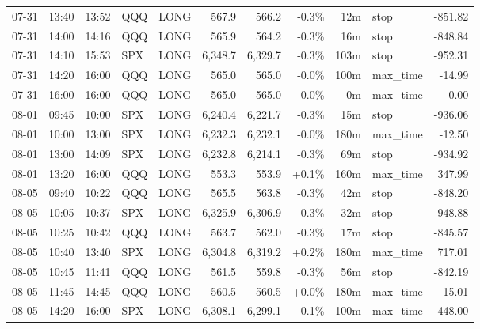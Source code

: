 \documentclass[11pt,a4paper,twoside]{article}
\begin{document}
\begin{center}
\begin{longtable}{>{\color{txtmain}}l l l l l r r r r >{\color{txtmain}}l r}
07-31 & 13:40 & 13:52 & QQQ & LONG & 567.9 & 566.2 & \textcolor{lossred}{-0.3\%} & 12m & stop & \textcolor{lossred}{-851.82} \\
07-31 & 14:00 & 14:16 & QQQ & LONG & 565.9 & 564.2 & \textcolor{lossred}{-0.3\%} & 16m & stop & \textcolor{lossred}{-848.84} \\
07-31 & 14:10 & 15:53 & SPX & LONG & 6,348.7 & 6,329.7 & \textcolor{lossred}{-0.3\%} & 103m & stop & \textcolor{lossred}{-952.31} \\
07-31 & 14:20 & 16:00 & QQQ & LONG & 565.0 & 565.0 & \textcolor{lossred}{-0.0\%} & 100m & max\_time & \textcolor{lossred}{-14.99} \\
07-31 & 16:00 & 16:00 & QQQ & LONG & 565.0 & 565.0 & \textcolor{lossred}{-0.0\%} & 0m & max\_time & \textcolor{lossred}{-0.00} \\
08-01 & 09:45 & 10:00 & SPX & LONG & 6,240.4 & 6,221.7 & \textcolor{lossred}{-0.3\%} & 15m & stop & \textcolor{lossred}{-936.06} \\
08-01 & 10:00 & 13:00 & SPX & LONG & 6,232.3 & 6,232.1 & \textcolor{lossred}{-0.0\%} & 180m & max\_time & \textcolor{lossred}{-12.50} \\
08-01 & 13:00 & 14:09 & SPX & LONG & 6,232.8 & 6,214.1 & \textcolor{lossred}{-0.3\%} & 69m & stop & \textcolor{lossred}{-934.92} \\
08-01 & 13:20 & 16:00 & QQQ & LONG & 553.3 & 553.9 & \textcolor{wingreen}{+0.1\%} & 160m & max\_time & \textcolor{wingreen}{347.99} \\
08-05 & 09:40 & 10:22 & QQQ & LONG & 565.5 & 563.8 & \textcolor{lossred}{-0.3\%} & 42m & stop & \textcolor{lossred}{-848.20} \\
08-05 & 10:05 & 10:37 & SPX & LONG & 6,325.9 & 6,306.9 & \textcolor{lossred}{-0.3\%} & 32m & stop & \textcolor{lossred}{-948.88} \\
08-05 & 10:25 & 10:42 & QQQ & LONG & 563.7 & 562.0 & \textcolor{lossred}{-0.3\%} & 17m & stop & \textcolor{lossred}{-845.57} \\
08-05 & 10:40 & 13:40 & SPX & LONG & 6,304.8 & 6,319.2 & \textcolor{wingreen}{+0.2\%} & 180m & max\_time & \textcolor{wingreen}{717.01} \\
08-05 & 10:45 & 11:41 & QQQ & LONG & 561.5 & 559.8 & \textcolor{lossred}{-0.3\%} & 56m & stop & \textcolor{lossred}{-842.19} \\
08-05 & 11:45 & 14:45 & QQQ & LONG & 560.5 & 560.5 & \textcolor{wingreen}{+0.0\%} & 180m & max\_time & \textcolor{wingreen}{15.01} \\
08-05 & 14:20 & 16:00 & SPX & LONG & 6,308.1 & 6,299.1 & \textcolor{lossred}{-0.1\%} & 100m & max\_time & \textcolor{lossred}{-448.00} \\

\end{longtable}
\end{center}
\end{document}
